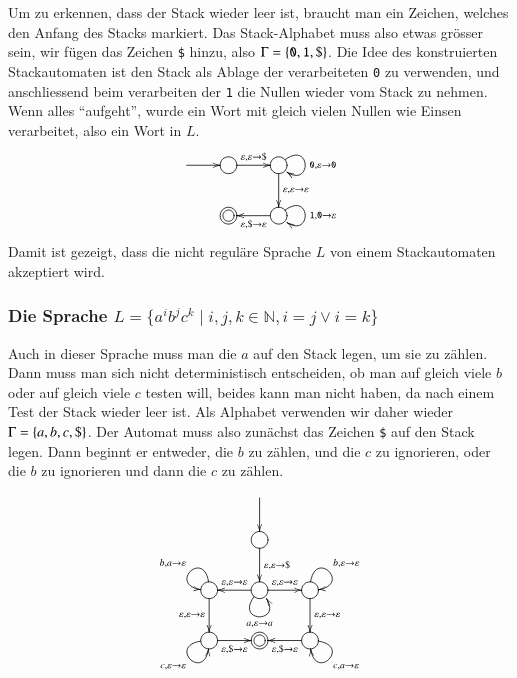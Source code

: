 Um zu erkennen, dass der Stack wieder leer ist, braucht man ein Zeichen,
welches den Anfang des Stacks markiert. Das Stack-Alphabet muss also 
etwas grösser sein, wir fügen das Zeichen {\tt \$} hinzu, also
$\Gamma=\{{\tt 0},{\tt 1},{\tt \$}\}$.
Die Idee des konstruierten Stackautomaten ist den Stack als Ablage der
verarbeiteten {\tt 0} zu verwenden, und anschliessend beim verarbeiten
der  {\tt 1} die Nullen wieder vom Stack zu nehmen. Wenn alles ``aufgeht'',
wurde ein Wort mit gleich vielen Nullen wie Einsen verarbeitet, also 
ein Wort in $L$.
\[
\entrymodifiers={++[o][F]}
\xymatrix{
*+\txt{}\ar[r]
	&{}\ar[r]^{\varepsilon,\varepsilon\to{\tt \$}}
		&{} \ar@(ur,dr)^{{\tt 0},\varepsilon\to{\tt 0}}
		    \ar[d]^{\varepsilon,\varepsilon\to\varepsilon}
\\
*+\txt{}
	&*++[o][F=]{}
		&{}\ar[l]^{\varepsilon,{\tt \$}\to\varepsilon}
		   \ar@(ur,dr)^{{\tt 1},{\tt 0}\to\varepsilon}
}
\]
Damit ist gezeigt, dass die nicht reguläre Sprache $L$ von einem Stackautomaten
akzeptiert wird.

\subsubsection{Die Sprache $L=\{a^ib^jc^k\;|\;i,j,k\in\mathbb N, i=j\vee i=k\}$}
Auch in dieser Sprache muss man die $a$ auf den Stack legen, um sie
zu zählen. Dann muss man sich nicht deterministisch entscheiden,
ob man auf gleich viele $b$ oder auf gleich viele $c$ testen will,
beides kann man nicht haben, da nach einem Test der Stack wieder leer
ist. Als Alphabet verwenden wir daher wieder $\Gamma=\{a,b,c,{\tt\$}\}$.
Der Automat muss also zunächst das Zeichen {\tt\$} auf den Stack legen.
Dann beginnt er entweder, die $b$ zu zählen, und die $c$ zu ignorieren,
oder die $b$ zu ignorieren und dann die $c$ zu zählen.
\[
\entrymodifiers={++[o][F]}
\xymatrix{
*+\txt{}
	&*+\txt{}\ar[d]
\\
*+\txt{}
	&{}\ar[d]^{\varepsilon,\varepsilon\to{\tt\$}}
\\
{}\ar@(u,l)_{b,a\to\varepsilon}
  \ar[d]_{\varepsilon,\varepsilon\to\varepsilon}
	&{}\ar@(dl,dr)_{a,\varepsilon\to a}
	   \ar[l]_{\varepsilon,\varepsilon\to\varepsilon}
	   \ar[r]^{\varepsilon,\varepsilon\to\varepsilon}
		&{}\ar@(u,r)^{b,\varepsilon\to\varepsilon}
		   \ar[d]^{\varepsilon,\varepsilon\to\varepsilon}
\\
{}\ar@(l,d)_{c,\varepsilon\to\varepsilon}
  \ar[r]_{\varepsilon,{\tt\$}\to\varepsilon}
	&*++[o][F=]{}
		&\ar@(r,d)^{c,a\to\varepsilon}
		  \ar[l]^{\varepsilon,{\tt\$}\to\varepsilon}
}
\]

